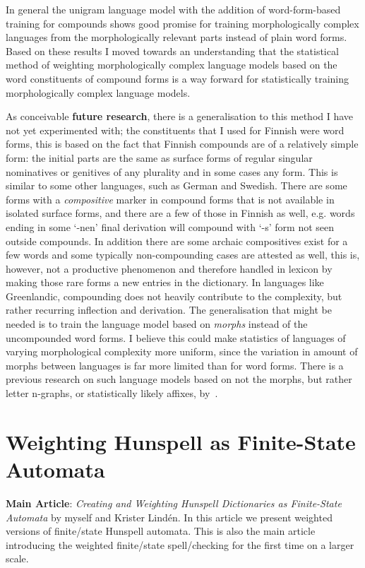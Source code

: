 \documentclass[officiallayout]{unihelcompling}
\begin{document}
In general the unigram language model with the addition of word-form-based
training for compounds shows good promise for training
morphologically complex languages from the morphologically relevant parts
instead of plain word forms. Based on these results I moved towards an 
understanding that the statistical method of weighting morphologically complex
language models based on the word constituents of compound forms is a way 
forward for statistically training morphologically complex language models.

As conceivable \textbf{future research}, there is a generalisation to this
method I have not yet experimented with; the constituents that I used for
Finnish were word forms, this is based on the fact that Finnish compounds are
of a relatively simple form: the initial parts are the same as surface forms of
regular singular nominatives or genitives of any plurality and in some cases
any form. This is similar to some other languages, such as German and Swedish.
There are some forms with a \emph{compositive} marker in compound forms that is
not available in isolated surface forms, and there are a few of those in
Finnish as well, e.g.\/ words ending in some `-nen' final derivation will
compound with `-s' form not seen outside compounds. In addition there
are some archaic compositives exist for a few words and some typically 
non-compounding cases are attested as well, this is, however, not a productive
phenomenon and therefore handled in lexicon by making those rare forms a new
entries in the dictionary.  In languages like Greenlandic, compounding
does not heavily contribute to the complexity, but rather recurring inflection
and derivation. The generalisation that might be needed is to train the
language model based on \emph{morphs} instead of the uncompounded word forms.
I believe this could make statistics of languages of varying morphological
complexity more uniform, since the variation in amount of morphs between
languages is far more limited than for word forms. There is a previous research
on such language models based on not the morphs, but rather letter n-graphs, or
statistically likely affixes, by~\citet{creutz2005morfessor}.


\section{Weighting Hunspell as Finite-State Automata}
\label{sec:hunspell-training}

\textbf{Main Article}: \emph{Creating and Weighting Hunspell Dictionaries as
Finite-State Automata} by myself and Krister Lindén. In this article we present
weighted versions of finite\-/state Hunspell automata. This is also the main
article introducing the weighted finite\-/state spell\-/checking for the first time
on a larger scale.
\end{document}
